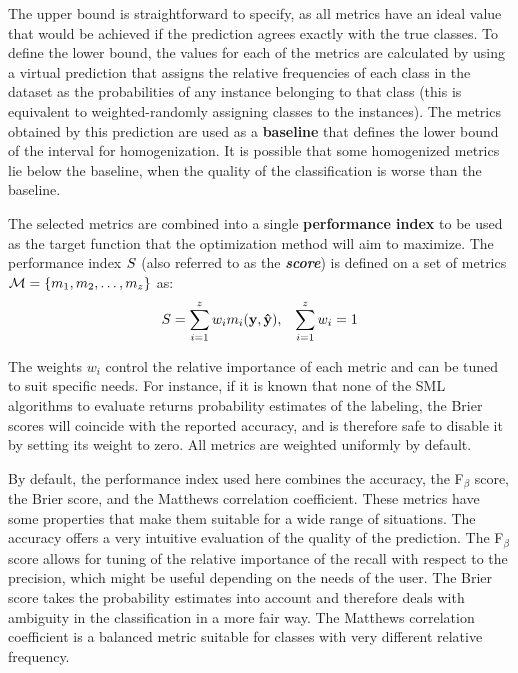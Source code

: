 	The upper bound is straightforward to specify, as all metrics have an ideal value that would be
	achieved if the prediction agrees exactly with the true classes. To define the lower bound, the
	values for each of the metrics are calculated by using a virtual prediction that assigns the
	relative frequencies of each class in the dataset as the probabilities of any instance
	belonging to that class (this is equivalent to weighted-randomly assigning classes to the
	instances). The metrics obtained by this prediction are used as a {\bf baseline} that defines
	the lower bound of the interval for homogenization. It is possible that some homogenized metrics
	lie below the baseline, when the quality of the classification is worse than the baseline.

	The selected metrics are combined into a single {\bf performance index} to be used as the target
	function that the optimization method will aim to maximize. The performance index $S$ (also
	referred to as the {\bf \emph{score}}) is defined on a set of metrics $\mathcal{M} = \{m_1, m_2,
	\ldots, m_z\}$ as:
	\begin{align}
		S &= \sum_{i=1}^z w_i m_i(\mathbf{y}, \mathbf{\hat{y}}), & \sum_{i=1}^z w_i = 1
		\label{eq:performance_index}
	\end{align}

	The weights $w_i$ control the relative importance of each metric and can be tuned to suit
	specific needs. For instance, if it is known that none of the SML algorithms to evaluate returns
	probability estimates of the labeling, the Brier scores will coincide with the reported
	accuracy, and is therefore safe to disable it by setting its weight to zero. All metrics are
	weighted uniformly by default.

	By default, the performance index used here combines the accuracy, the F$_\beta$ score, the
	Brier score, and the Matthews correlation coefficient. These metrics have some properties that
	make them suitable for a wide range of situations. The accuracy offers a very intuitive
	evaluation of the quality of the prediction. The F$_\beta$ score allows for tuning of the relative
	importance of the recall with respect to the precision, which might be useful depending on the
	needs of the user. The Brier score takes the probability estimates into account and therefore
	deals with ambiguity in the classification in a more fair way. The Matthews correlation
	coefficient is a balanced metric suitable for classes with very different relative frequency.

